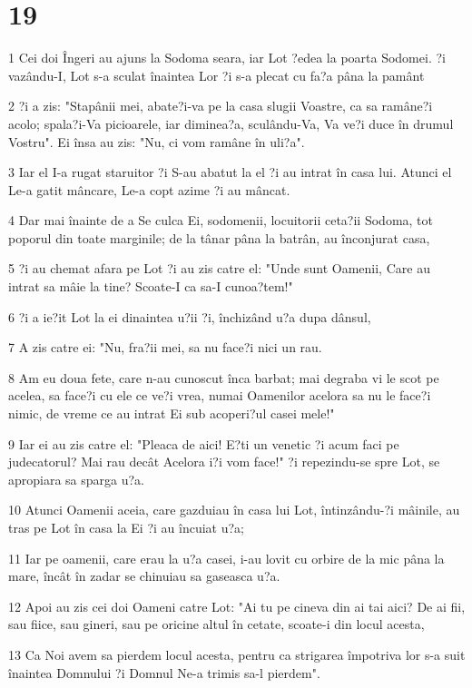 \chapter{19}

\par 1 Cei doi Îngeri au ajuns la Sodoma seara, iar Lot ?edea la poarta Sodomei. ?i vazându-I, Lot s-a sculat înaintea Lor ?i s-a plecat cu fa?a pâna la pamânt
\par 2 ?i a zis: "Stapânii mei, abate?i-va pe la casa slugii Voastre, ca sa ramâne?i acolo; spala?i-Va picioarele, iar diminea?a, sculându-Va, Va ve?i duce în drumul Vostru". Ei însa au zis: "Nu, ci vom ramâne în uli?a".
\par 3 Iar el I-a rugat staruitor ?i S-au abatut la el ?i au intrat în casa lui. Atunci el Le-a gatit mâncare, Le-a copt azime ?i au mâncat.
\par 4 Dar mai înainte de a Se culca Ei, sodomenii, locuitorii ceta?ii Sodoma, tot poporul din toate marginile; de la tânar pâna la batrân, au înconjurat casa,
\par 5 ?i au chemat afara pe Lot ?i au zis catre el: "Unde sunt Oamenii, Care au intrat sa mâie la tine? Scoate-I ca sa-I cunoa?tem!"
\par 6 ?i a ie?it Lot la ei dinaintea u?ii ?i, închizând u?a dupa dânsul,
\par 7 A zis catre ei: "Nu, fra?ii mei, sa nu face?i nici un rau.
\par 8 Am eu doua fete, care n-au cunoscut înca barbat; mai degraba vi le scot pe acelea, sa face?i cu ele ce ve?i vrea, numai Oamenilor acelora sa nu le face?i nimic, de vreme ce au intrat Ei sub acoperi?ul casei mele!"
\par 9 Iar ei au zis catre el: "Pleaca de aici! E?ti un venetic ?i acum faci pe judecatorul? Mai rau decât Acelora i?i vom face!" ?i repezindu-se spre Lot, se apropiara sa sparga u?a.
\par 10 Atunci Oamenii aceia, care gazduiau în casa lui Lot, întinzându-?i mâinile, au tras pe Lot în casa la Ei ?i au încuiat u?a;
\par 11 Iar pe oamenii, care erau la u?a casei, i-au lovit cu orbire de la mic pâna la mare, încât în zadar se chinuiau sa gaseasca u?a.
\par 12 Apoi au zis cei doi Oameni catre Lot: "Ai tu pe cineva din ai tai aici? De ai fii, sau fiice, sau gineri, sau pe oricine altul în cetate, scoate-i din locul acesta,
\par 13 Ca Noi avem sa pierdem locul acesta, pentru ca strigarea împotriva lor s-a suit înaintea Domnului ?i Domnul Ne-a trimis sa-l pierdem".
